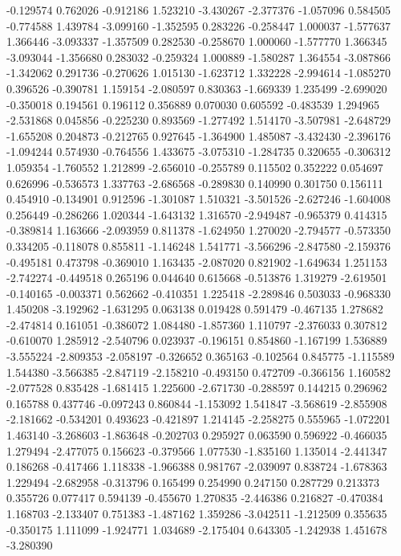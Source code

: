 -0.129574
0.762026
-0.912186
1.523210
-3.430267
-2.377376
-1.057096
0.584505
-0.774588
1.439784
-3.099160
-1.352595
0.283226
-0.258447
1.000037
-1.577637
1.366446
-3.093337
-1.357509
0.282530
-0.258670
1.000060
-1.577770
1.366345
-3.093044
-1.356680
0.283032
-0.259324
1.000889
-1.580287
1.364554
-3.087866
-1.342062
0.291736
-0.270626
1.015130
-1.623712
1.332228
-2.994614
-1.085270
0.396526
-0.390781
1.159154
-2.080597
0.830363
-1.669339
1.235499
-2.699020
-0.350018
0.194561
0.196112
0.356889
0.070030
0.605592
-0.483539
1.294965
-2.531868
0.045856
-0.225230
0.893569
-1.277492
1.514170
-3.507981
-2.648729
-1.655208
0.204873
-0.212765
0.927645
-1.364900
1.485087
-3.432430
-2.396176
-1.094244
0.574930
-0.764556
1.433675
-3.075310
-1.284735
0.320655
-0.306312
1.059354
-1.760552
1.212899
-2.656010
-0.255789
0.115502
0.352222
0.054697
0.626996
-0.536573
1.337763
-2.686568
-0.289830
0.140990
0.301750
0.156111
0.454910
-0.134901
0.912596
-1.301087
1.510321
-3.501526
-2.627246
-1.604008
0.256449
-0.286266
1.020344
-1.643132
1.316570
-2.949487
-0.965379
0.414315
-0.389814
1.163666
-2.093959
0.811378
-1.624950
1.270020
-2.794577
-0.573350
0.334205
-0.118078
0.855811
-1.146248
1.541771
-3.566296
-2.847580
-2.159376
-0.495181
0.473798
-0.369010
1.163435
-2.087020
0.821902
-1.649634
1.251153
-2.742274
-0.449518
0.265196
0.044640
0.615668
-0.513876
1.319279
-2.619501
-0.140165
-0.003371
0.562662
-0.410351
1.225418
-2.289846
0.503033
-0.968330
1.450208
-3.192962
-1.631295
0.063138
0.019428
0.591479
-0.467135
1.278682
-2.474814
0.161051
-0.386072
1.084480
-1.857360
1.110797
-2.376033
0.307812
-0.610070
1.285912
-2.540796
0.023937
-0.196151
0.854860
-1.167199
1.536889
-3.555224
-2.809353
-2.058197
-0.326652
0.365163
-0.102564
0.845775
-1.115589
1.544380
-3.566385
-2.847119
-2.158210
-0.493150
0.472709
-0.366156
1.160582
-2.077528
0.835428
-1.681415
1.225600
-2.671730
-0.288597
0.144215
0.296962
0.165788
0.437746
-0.097243
0.860844
-1.153092
1.541847
-3.568619
-2.855908
-2.181662
-0.534201
0.493623
-0.421897
1.214145
-2.258275
0.555965
-1.072201
1.463140
-3.268603
-1.863648
-0.202703
0.295927
0.063590
0.596922
-0.466035
1.279494
-2.477075
0.156623
-0.379566
1.077530
-1.835160
1.135014
-2.441347
0.186268
-0.417466
1.118338
-1.966388
0.981767
-2.039097
0.838724
-1.678363
1.229494
-2.682958
-0.313796
0.165499
0.254990
0.247150
0.287729
0.213373
0.355726
0.077417
0.594139
-0.455670
1.270835
-2.446386
0.216827
-0.470384
1.168703
-2.133407
0.751383
-1.487162
1.359286
-3.042511
-1.212509
0.355635
-0.350175
1.111099
-1.924771
1.034689
-2.175404
0.643305
-1.242938
1.451678
-3.280390
